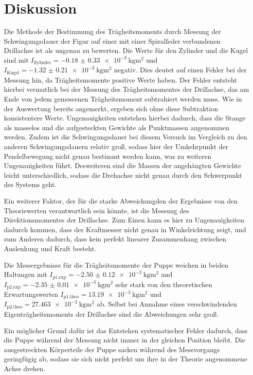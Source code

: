 \section{Diskussion}
\label{sec:Diskussion}

Die Methode der Bestimmung des Trägheitsmoments durch Messung der Schwingungsdauer
der Figur auf einer mit einer Spiralfeder verbundenen Drillachse ist als ungenau
zu bewerten.
Die Werte für den Zylinder und die Kugel sind mit $I_{\text{Zylinder}} = \SI{-0.18(033)e-3}{\kilogram\meter\squared}$
und $I_{\text{Kugel}}=\SI{-1.32(021)e-3}{\kilogram\meter\squared}$ negativ. Dies
deutet auf einen Fehler bei der Messung hin, da Trägheitsmomente positive Werte haben. Der Fehler entsteht
hierbei vermutlich bei der Messung des Trägheitsmomentes der Drillachse, das am Ende
von jedem gemessenen Trägheitsmoment subtrahiert werden muss. Wie in der Auswertung
bereits angemerkt, ergeben sich ohne diese Subtraktion konsistentere Werte. Ungenauigkeiten entstehen
hierbei dadurch, dass die Stange als masselos und die aufgesteckten Gewichte als
Punktmassen angenommen werden. Zudem ist die Schwingungsdauer bei diesem Versuch
im Vergleich zu den anderen Schwingungsdauern relativ groß, sodass hier der Umkehrpunkt
der Pendelbewegung nicht genau bestimmt werden kann, was zu weiteren Ungenauigkeiten führt.
Desweiteren sind die Massen der angehängten Gewichte leicht unterschiedlich, sodass
die Drehachse nicht genau durch den Schwerpunkt des Systems geht.

Ein weiterer Faktor, der für die starke Abweichungden der Ergebnisse von den
Theoriewerten verantwortlich sein könnte, ist die Messung des Direktionsmomentes
der Drillachse. Zum Einen kann es hier zu Ungenauigkeiten dadurch kommen, dass der
Kraftmesser nicht genau in Winkelrichtung zeigt, und zum
Anderen dadurch, dass kein perfekt linearer Zusammenhang zwischen Auslenkung und Kraft
besteht.

Die Messergebnisse für die Trägheitsmomente der Puppe weichen in beiden Haltungen
mit $I_{\text{p1,exp}} = \SI{-2.50(012)e-3}{\kilogram\meter\squared}$ und
$I_{\text{p2,exp}} = \SI{-2.35(001)e-3}{\kilogram\meter\squared}$
sehr stark von den theoretischen Erwartungswerten $I_{\text{p1,theo}} = \SI{13.19e-3}{\kilogram\meter\squared}$
und $I_{\text{p2,theo}} = \SI{27.463e-3}{\kilogram\meter\squared}$ ab. Selbst bei
Annahme eines verschwindenden Eigenträgheitsmoments der Drillachse sind die Abweichungen
sehr groß.

Ein möglicher Grund dafür ist das Entstehen systematischer Fehler dadurch,
dass die Puppe während der Messung nicht immer in der gleichen Position bleibt. Die ausgestreckten
Körperteile der Puppe sacken während des Messvorgangs geringfügig ab, sodass sie sich
nicht perfekt um ihre in der Theorie angenommene Achse drehen.

